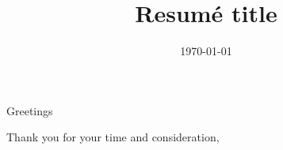 \documentclass[11pt,a4paper,sans]{moderncv}
\title{Resumé title}                               %
\begin{document}
\date{\today}
\opening{Greetings}
\closing{Thank you for your time and consideration,}
\makelettertitle



\makeletterclosing
\end{document}

